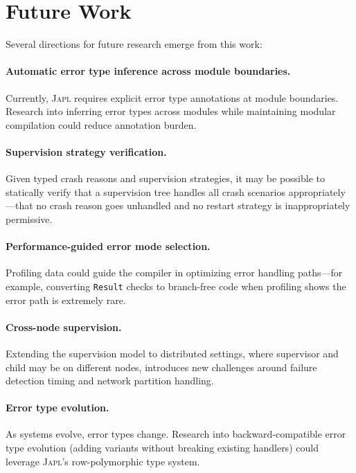 \documentclass[11pt,twocolumn]{article}
\newcommand{\japl}{\textsc{Japl}}
\newcommand{\Result}{\texttt{Result}}
\begin{document}
\section{Future Work}\label{sec:future}

Several directions for future research emerge from this work:

\paragraph{Automatic error type inference across module boundaries.} Currently, \japl{} requires explicit error type annotations at module boundaries. Research into inferring error types across modules while maintaining modular compilation could reduce annotation burden.

\paragraph{Supervision strategy verification.} Given typed crash reasons and supervision strategies, it may be possible to statically verify that a supervision tree handles all crash scenarios appropriately---that no crash reason goes unhandled and no restart strategy is inappropriately permissive.

\paragraph{Performance-guided error mode selection.} Profiling data could guide the compiler in optimizing error handling paths---for example, converting \Result{} checks to branch-free code when profiling shows the error path is extremely rare.

\paragraph{Cross-node supervision.} Extending the supervision model to distributed settings, where supervisor and child may be on different nodes, introduces new challenges around failure detection timing and network partition handling.

\paragraph{Error type evolution.} As systems evolve, error types change. Research into backward-compatible error type evolution (adding variants without breaking existing handlers) could leverage \japl{}'s row-polymorphic type system.
\end{document}
